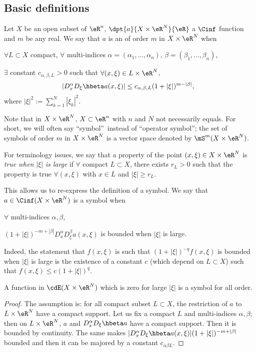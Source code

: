 \subsection{Basic definitions}

\begin{definition}
	Let $X$ be an open subset of $\eR^n$, $\dpt{a}{X\times\eR^N}{\eR}$ a $\Cinf$ function and $m$ be any real. We say that $a$ is an  of order $m$ in $X\times\eR^N$ when

	$\forall L\subset X$ compact, $\forall$ multi-indices $\alpha=(\alpha_1,\ldots,\alpha_n)$, $\beta=(\beta_1,\ldots,\beta_n)$,

	$\exists$ constant $c_{\alpha,\beta,L}>0$ such that $\forall (x,\xi)\in L\times\eR^N$,
	\begin{equation}\label{eq:cond_symbol}
		|D_x^{\alpha} D_{\xi}\hbeta a(x,\xi)|\leq c_{\alpha,\beta,L}(1+|\xi|)^{m-|\beta|},
	\end{equation}
	where $|\xi|^2:=\sum_{k=1}^{N}|\xi_k|^2$.
\end{definition}

Note that in $X\times \eR^N$, $X\subset\eR^n$ with $n$ and $N$ not necessarily equals. For short, we will often say ``symbol''\ instead of ``operator symbol''; the set of symbols of order $m$ in $X\times\eR^N$  is a vector space denoted by $\mS^m(X\times\eR^N)$\label{pg:defmS}.

For terminology issues, we say that a property of the point $(x,\xi)\in X\times\eR^N$ is \emph{true when $|\xi|$ is large} if $\forall$ compact $L\subset X$, there exists $r_L>0$ such that the property is true $\forall(x,\xi)$ with $x\in L$ and $|\xi|\geq r_L$.

\noindent This allows us to re-express the definition of a symbol. We say that $a\in\Cinf(X\times\eR^N)$ is a symbol when

$\forall$ multi-indices $\alpha,\beta$,

$(1+|\xi|)^{-m+|\beta|}D_x^{\alpha}D_{\xi}^{\beta}a(x,\xi)$ is bounded when $|\xi|$ is large.

\noindent Indeed, the statement that $f(x,\xi)$ is such that $(1+|\xi|)^{-q}f(x,\xi)$ is bounded when $|\xi|$ is large is the existence of a constant $c$ (which depend on $L\subset X$) such that $f(x,\xi)\leq c(1+|\xi|)^q$.

\begin{proposition}
	A function in $\cdE(X\times\eR^N)$ which is zero for large $| \xi |$ is a symbol for all order.
\end{proposition}
\begin{proof}
	The assumption is: for all compact subset $L\subset X$, the restriction of $a$ to $L\times\eR^N$ have a compact support. Let us fix a compact $L$ and multi-indices $\alpha,\beta$; then on $L\times\eR^N$, $a$ and $D_x^{\alpha} D_{\xi}\hbeta a$ have a compact support. Then it is bounded by continuity. The same makes $|D_x^{\alpha} D_{\xi}\hbeta a(x,\xi)|(1+|\xi|)^{-m+|\beta|}$ bounded and then it can be majored by a constant $c_{\alpha\beta L}$.
\end{proof}

